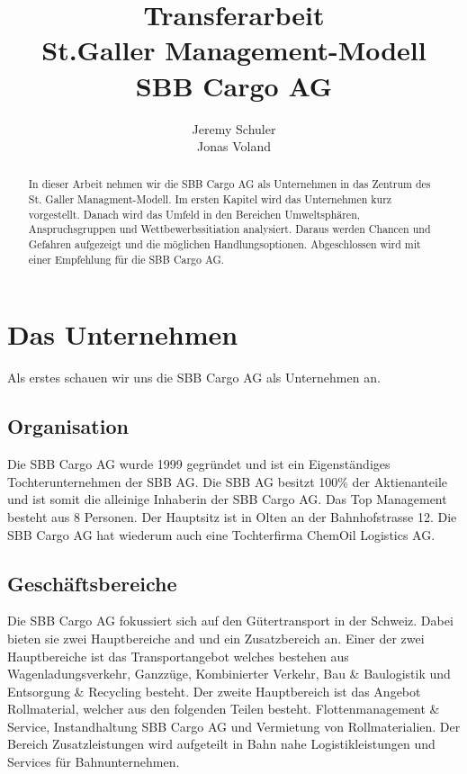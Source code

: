 \documentclass{article}
\title{
    Transferarbeit
    \\St.Galler Management-Modell
    \\SBB Cargo AG}
\author{
    Jeremy Schuler\\
    Jonas Voland
}
\begin{document}
\begin{titlepage}
    \maketitle
\end{titlepage}

\setcounter{page}{2}

\begin{abstract}
In dieser Arbeit nehmen wir die SBB Cargo AG als Unternehmen in das Zentrum des St. Galler Managment-Modell.
Im ersten Kapitel wird das Unternehmen kurz vorgestellt.
Danach wird das Umfeld in den Bereichen Umweltsphären, Anspruchsgruppen und Wettbewerbssitiation analysiert.
Daraus werden Chancen und Gefahren aufgezeigt und die möglichen Handlungsoptionen.
Abgeschlossen wird mit einer Empfehlung für die SBB Cargo AG.
\end{abstract}

\tableofcontents

\newpage

\section{Das Unternehmen}

Als erstes schauen wir uns die SBB Cargo AG als Unternehmen an.

\subsection{Organisation}

Die SBB Cargo AG wurde 1999 gegründet und ist ein Eigenständiges Tochterunternehmen der SBB AG.
Die SBB AG besitzt 100\% der Aktienanteile und ist somit die alleinige Inhaberin der SBB Cargo AG.
Das Top Management besteht aus 8 Personen.
\parencite{managmentOrganigram}
Der Hauptsitz ist in Olten an der Bahnhofstrasse 12.
Die SBB Cargo AG hat wiederum auch eine Tochterfirma ChemOil Logistics AG.

\subsection{Geschäftsbereiche}

Die SBB Cargo AG fokussiert sich auf den Gütertransport in der Schweiz.
Dabei bieten sie zwei Hauptbereiche and und ein Zusatzbereich an.
Einer der zwei Hauptbereiche ist das Transportangebot welches bestehen aus Wagenladungsverkehr, Ganzzüge, Kombinierter Verkehr, Bau \& Baulogistik und Entsorgung \& Recycling besteht.
Der zweite Hauptbereich ist das Angebot Rollmaterial, welcher aus den folgenden Teilen besteht. Flottenmanagement \& Service, Instandhaltung SBB Cargo AG und Vermietung von Rollmaterialien. 
Der Bereich Zusatzleistungen wird aufgeteilt in Bahn nahe Logistikleistungen und Services für Bahnunternehmen. 
\end{document}
